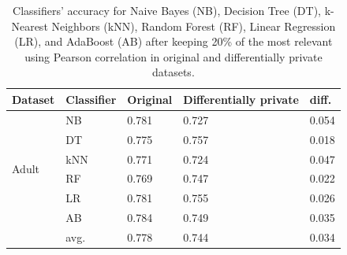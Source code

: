 \begin{table}[H]
\label{fig:classifiers}
\centering
\begin{tabular}{lllll}
Dataset                & Classifier & Original & Differentially private & diff. \\ \hline
\multirow{6}{*}{Adult} & NB         & 0.781    & 0.727                  & 0.054 \\
                       & DT         & 0.775    & 0.757                  & 0.018 \\
                       & kNN        & 0.771    & 0.724                  & 0.047 \\
                       & RF         & 0.769    & 0.747                  & 0.022 \\
                       & LR         & 0.781    & 0.755                  & 0.026 \\
                       & AB         & 0.784    & 0.749                  & 0.035 \\ \cline{2-5} 
                       & avg.       & 0.778    & 0.744                  & 0.034
\end{tabular}
\caption{Classifiers' accuracy for Naive Bayes (NB), Decision Tree (DT), k-Nearest Neighbors (kNN), Random Forest (RF), Linear Regression (LR), and AdaBoost (AB) after keeping 20\% of the most relevant using Pearson correlation in original and differentially private datasets.}
\end{table}

